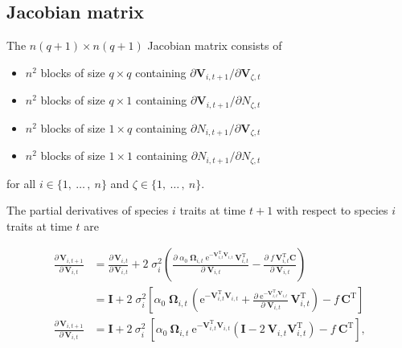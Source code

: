 \subsection*{Jacobian matrix}

The $n(q+1) \times n(q+1)$ Jacobian matrix consists of 

\begin{itemize}
\item $n^2$ blocks of size $q \times q$ containing
    $\partial \mathbf{V}_{i,t+1} / \partial \mathbf{V}_{\zeta,t}$
\item $n^2$ blocks of size $q \times 1$ containing
    $\partial \mathbf{V}_{i,t+1} / \partial N_{\zeta,t}$
\item $n^2$ blocks of size $1 \times q$ containing
    $\partial N_{i,t+1} / \partial \mathbf{V}_{\zeta,t}$
\item $n^2$ blocks of size $1 \times 1$ containing
    $\partial N_{i,t+1} / \partial N_{\zeta,t}$
\end{itemize}


for all $i \in \{ 1, \: \ldots \, , \: n \}$
and $\zeta \in \{ 1, \: \ldots \, , \: n \}$.


The partial derivatives of species $i$ traits at time $t+1$ with respect
to species $i$ traits at time $t$ are

\begin{equation*}
\begin{split}
    \frac{ \partial \, \mathbf{V}_{i,t+1} }{ \partial \, \mathbf{V}_{i,t} } &=
        \frac{ \partial \, \mathbf{V}_{i,t} }{ \partial \, \mathbf{V}_{i,t} } +
        2 \; \sigma_i^2
        \left(
            \frac{ \partial \;
                \alpha_0 \; \mathbf{\Omega}_{i,t} \;
                    \textrm{e}^{-\mathbf{V}_{i,t}^{\textrm{T}} \mathbf{V}_{i,t}} \,
                    \mathbf{V}_{i,t}^{\textrm{T}}}{\partial \; \mathbf{V}_{i,t} } -
            \frac{ \partial \; f \, \mathbf{V}_{i,t}^{\textrm{T}} \mathbf{C}}{\partial \; \mathbf{V}_{i,t} }
        \right) \\
    &=
        \mathbf{I} +
        2 \; \sigma_i^2
        \left[
            \alpha_0 \; \mathbf{\Omega}_{i,t} \,
            \left(
                \textrm{e}^{-\mathbf{V}_{i,t}^{\textrm{T}} \mathbf{V}_{i,t}} +
                \frac{ \partial \;
                        \textrm{e}^{-\mathbf{V}_{i,t}^{\textrm{T}} \mathbf{V}_{i,t}}
                        }{\partial \; \mathbf{V}_{i,t} } \, \mathbf{V}_{i,t}^{\textrm{T}}
            \right) -
            f \, \mathbf{C}^{\textrm{T}}
            \right] \\[2ex]
    \frac{ \partial \, \mathbf{V}_{i,t+1} }{ \partial \, \mathbf{V}_{i,t} } &= \mathbf{I} + 2 ~ \sigma_i^2 ~
        \left[
            \alpha_0 ~ \mathbf{\Omega}_{i,t} ~ \textrm{e}^{ - \mathbf{V}_{i,t}^{\textrm{T}} \mathbf{V}_{i,t} }
            \left(
                \mathbf{I} - 2 ~ \mathbf{V}_{i,t} \mathbf{V}_{i,t}^{\textrm{T}}
            \right) -
            f \: \mathbf{C}^{\textrm{T}}
        \right]
    \textrm{,}
\end{split}
\end{equation*}

